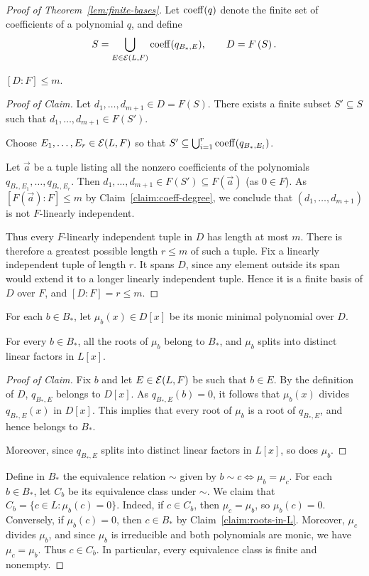 \begin{proof}[Proof of Theorem~\ref{lem:finite-bases}]
Let $\operatorname{coeff}(q)$ denote the finite set of coefficients of a
polynomial $q$, and define
\begin{equation*}
S=\bigcup_{E\in\mathcal E(L,F)}\operatorname{coeff}(q_{B_*,E}),\qquad
 D=F\left(S\right).
\end{equation*}

\begin{claim}\label{claim:D-degree} $[D:F]\le m$.
\end{claim}
\begin{proof}[Proof of Claim]
Let $d_1,\ldots,d_{m+1}\in D=F(S)$.
There exists a finite subset $S'\subseteq S$
such that $d_1,\ldots,d_{m+1}\in F(S')$.

Choose
$E_1,\ldots,E_r\in\mathcal E(L,F)$ so that $S'\subseteq\bigcup_{i=1}^r\operatorname{coeff}(q_{B_*,E_i})$.


Let $\vec a$ be a tuple listing all the nonzero coefficients of the polynomials $q_{B_*,E_1},\ldots,q_{B_*,E_r}$.
Then $d_1,\ldots,d_{m+1}\in F(S')\subseteq F(\vec a)$ (as $0 \in F$).
As $[F(\vec a):F]\le m$ by Claim~\ref{claim:coeff-degree}, we conclude that $(d_1,\ldots,d_{m+1})$ is not $F$-linearly independent.

Thus every $F$-linearly independent tuple in $D$ has length at most $m$.
There is therefore a greatest possible length $r\le m$ of such a tuple.
Fix a linearly independent tuple of length $r$. It spans $D$, since any
element outside its span would extend it to a longer linearly independent
tuple. Hence it is a finite basis of $D$ over $F$, and $[D:F]=r\le m$.
\end{proof}
For each $b\in B_*$, let $\mu_b(x)\in D[x]$ be its monic minimal polynomial over $D$.
\begin{claim}\label{claim:roots-in-L}
       For every $b\in B_*$, all the roots of $\mu_b$ belong to $B_*$, and $\mu_b$ splits into distinct linear factors in $L[x]$.
\end{claim}
\begin{proof}[Proof of Claim]
Fix $b$ and let $E\in\mathcal E(L,F)$ be such that $b\in E$.
By the definition of $D$,
$q_{B_*,E}$ belongs to $D[x]$.
As $q_{B_*,E}(b)=0$, it follows that $\mu_b(x)$ divides $q_{B_*,E}(x)$ in $D[x]$.
This implies that every root of $\mu_b$ is a root of $q_{B_*,E}$, and hence belongs to $B_*$.

Moreover, since $q_{B_*,E}$ splits into distinct linear factors in $L[x]$, so does $\mu_b$.
\end{proof}

Define in $B_*$ the equivalence relation $\sim$ given by
$b\sim c\Longleftrightarrow\mu_b=\mu_c$.
For each $b\in B_*$, let $C_b$ be its equivalence class under $\sim$. We claim that
$C_b=\{c\in L:\mu_b(c)=0\}$.
Indeed, if $c\in C_b$, then $\mu_c=\mu_b$, so $\mu_b(c)=0$.
Conversely, if $\mu_b(c)=0$, then $c\in B_*$ by
Claim~\ref{claim:roots-in-L}. Moreover, $\mu_c$ divides $\mu_b$, and
since $\mu_b$ is irreducible and both polynomials are monic, we have
$\mu_c=\mu_b$. Thus $c\in C_b$. In particular, every equivalence class
is finite and nonempty.


\end{proof}

